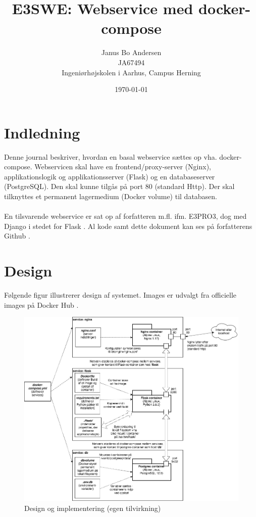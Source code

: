 \documentclass[a4paper]{article}
\title{E3SWE: Webservice med docker-compose}
\author{Janus Bo Andersen  \\
	JA67494 \\
	Ingeniørhøjskolen i Aarhus, Campus Herning
	}
\date{\today}
\begin{document}
\maketitle

\section{Indledning}
Denne journal beskriver, hvordan en basal webservice sættes op vha. docker-compose.
Webservicen skal have en frontend/proxy-server (Nginx),
applikationslogik og applikationsserver (Flask) og en
databaseserver (PostgreSQL).
Den skal kunne tilgås på port 80 (standard Http).
Der skal tilknyttes et permanent lagermedium (Docker volume) til databasen.
\\\\
En tilsvarende webservice er sat op af forfatteren m.fl. ifm. E3PRO3, dog med Django i stedet for Flask \cite{team2}.
Al kode samt dette dokument kan ses på forfatterens Github \cite{janus}.

\section{Design}
Følgende figur illustrerer design af systemet.
Images er udvalgt fra officielle images på Docker Hub \cite{hub}.

\begin{figure}[H]
\centering
\includegraphics[width=14cm]{../img/flask-django.png}
\caption{Design og implementering (egen tilvirkning)\label{fig:design}}
\end{figure}
\end{document}
